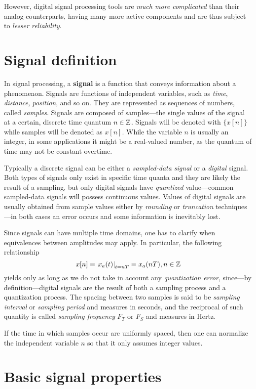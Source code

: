 \documentclass[\documentfontsize, twocolumn]{\classname}
\begin{document}
However, digital signal processing tools are \emph{much more complicated} than their analog counterparts, having many more active components and are thus subject to \emph{lesser reliability}.

\section{Signal definition}

In signal processing, a \textbf{signal} is a function that conveys information about a phenomenon. Signals are functions of independent variables, such as \emph{time}, \emph{distance}, \emph{position}, and so on. They are represented as se\-quen\-ces of numbers, called \emph{samples}. Signals are composed of samples---the single values of the signal at a certain, discrete time quantum $n \in \mathbb Z$. Signals will be denoted with $\{x[n]\}$ while samples will be denoted as $x[n]$. While the variable $n$ is usually an integer, in some applications it might be a real-valued number, as the quantum of time may not be constant overtime.

Typically a discrete signal can be either a \emph{sampled-data signal} or a \emph{digital} signal. Both types of signals only exist in specific time quanta and they are likely the result of a sampling, but only digital signals have \emph{quantized} value---common sampled-data signals will possess continuous values. Values of digital signals are usually obtained from sample values either by \emph{rounding} or \emph{truncation} techniques---in both cases an error occurs and some information is inevitably lost.

Since signals can have multiple time domains, one has to clarify when equivalences between amplitudes may apply. In particular, the following relationship \[ x[n] = \left.x_a(t)\right|_{t=nT} = x_a(nT), n \in \mathbb Z\] yields only as long as we do not take in account any \emph{quantization error}, since---by definition---digital signals are the result of both a sampling process and a quantization process. The spacing between two samples is said to be \emph{sampling interval} or \emph{sampling period} and measures in seconds, and the reciprocal of such quantity is called \emph{sampling frequency} $F_T$ or $F_S$ and measures in Hertz.

If the time in which samples occur are uniformly spaced, then one can normalize the independent variable $n$ so that it only assumes integer values.

\section{Basic signal properties}
\end{document}
